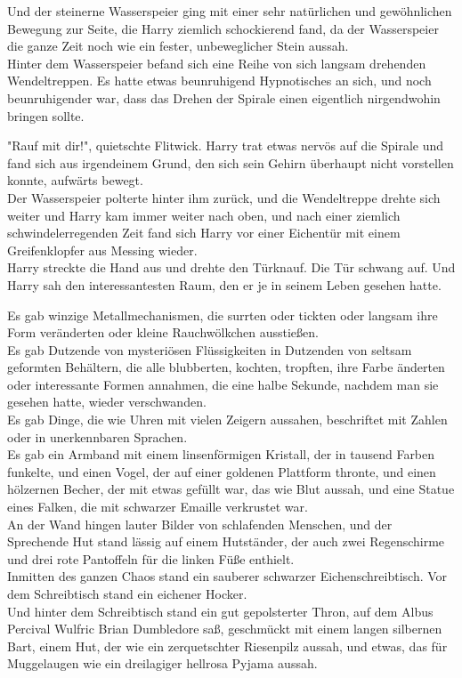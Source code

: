 {Und der steinerne Wasserspeier ging mit einer sehr natürlichen und gewöhnlichen Bewegung zur Seite, die Harry ziemlich schockierend fand, da der Wasserspeier die ganze Zeit noch wie ein fester, unbeweglicher Stein aussah.\\ Hinter dem Wasserspeier befand sich eine Reihe von sich langsam drehenden Wendeltreppen. Es hatte etwas beunruhigend Hypnotisches an sich, und noch beunruhigender war, dass das Drehen der Spirale einen eigentlich nirgendwohin bringen sollte.

"Rauf mit dir!", quietschte Flitwick. Harry trat etwas nervös auf die Spirale und fand sich aus irgendeinem Grund, den sich sein Gehirn überhaupt nicht vorstellen konnte, aufwärts bewegt.\\ Der Wasserspeier polterte hinter ihm zurück, und die Wendeltreppe drehte sich weiter und Harry kam immer weiter nach oben, und nach einer ziemlich schwindelerregenden Zeit fand sich Harry vor einer Eichentür mit einem Greifenklopfer aus Messing wieder.\\ Harry streckte die Hand aus und drehte den Türknauf. Die Tür schwang auf. Und Harry sah den interessantesten Raum, den er je in seinem Leben gesehen hatte.

Es gab winzige Metallmechanismen, die surrten oder tickten oder langsam ihre Form veränderten oder kleine Rauchwölkchen ausstießen.\\ Es gab Dutzende von mysteriösen Flüssigkeiten in Dutzenden von seltsam geformten Behältern, die alle blubberten, kochten, tropften, ihre Farbe änderten oder interessante Formen annahmen, die eine halbe Sekunde, nachdem man sie gesehen hatte, wieder verschwanden.\\ Es gab Dinge, die wie Uhren mit vielen Zeigern aussahen, beschriftet mit Zahlen oder in unerkennbaren Sprachen.\\ Es gab ein Armband mit einem linsenförmigen Kristall, der in tausend Farben funkelte, und einen Vogel, der auf einer goldenen Plattform thronte, und einen hölzernen Becher, der mit etwas gefüllt war, das wie Blut aussah, und eine Statue eines Falken, die mit schwarzer Emaille verkrustet war.\\ An der Wand hingen lauter Bilder von schlafenden Menschen, und der Sprechende Hut stand lässig auf einem Hutständer, der auch zwei Regenschirme und drei rote Pantoffeln für die linken Füße enthielt.\\ Inmitten des ganzen Chaos stand ein sauberer schwarzer Eichenschreibtisch. Vor dem Schreibtisch stand ein eichener Hocker.\\ Und hinter dem Schreibtisch stand ein gut gepolsterter Thron, auf dem Albus Percival Wulfric Brian Dumbledore saß, geschmückt mit einem langen silbernen Bart, einem Hut, der wie ein zerquetschter Riesenpilz aussah, und etwas, das für Muggelaugen wie ein dreilagiger hellrosa Pyjama aussah.

}
